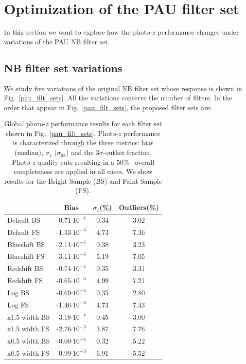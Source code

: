 \section{Optimization of the PAU filter set}
\label{sec:opti}

In this section we want to explore how the photo-$z$ performance changes under variations of the PAU NB filter set. 

\subsection{NB filter set variations}
We study five variations of the original NB filter set whose response is shown in Fig.~\ref{pau_filt_sets}. All the variations conserve the number of filters. In the order that appear in Fig.~\ref{pau_filt_sets}, the proposed filter sets are:

\begin{table}
\centering
\caption{Global photo-$z$ performance results for each filter set shown in Fig.~\ref{pau_filt_sets}.  Photo-$z$ performance is characterized through the three metrics: bias (median), $\sigma_z$ ($\sigma_{68}$) and the $3\sigma$-outlier fraction. Photo-$z$ quality cuts resulting in a 50\% \ overall completeness are applied in all cases. We show results for the
Bright Sample (BS) and Faint Sample (FS).}
\begin{tabular}{lccc}
 & Bias & $\sigma_z$(\%) & Outliers(\%) \\
\hline
Default BS & -0.71$\cdot10^{-4}$ & 0.34 & 3.02
\\
Default FS & -1.33$\cdot10^{-3}$ & 4.73 & 7.36
\\
\hline
Blueshift BS &-2.11$\cdot10^{-4}$ & 0.38 &  3.23
\\
Blueshift FS & -3.11$\cdot10^{-3}$ & 5.19 & 7.05
\\
\hline
Redshift BS &-0.74$\cdot10^{-4}$  & 0.35 &   3.31
\\
Redshift FS &  -0.65$\cdot10^{-3}$  & 4.99 & 7.21
\\
\hline
Log BS &-0.69$\cdot10^{-4}$  & 0.35 &   2.80
\\
Log FS &  -1.46$\cdot10^{-3}$  & 4.73 & 7.43
\\
\hline
x1.5 width BS &-3.18$\cdot10^{-4}$  & 0.45 &   3.00
\\
x1.5 width FS &  -2.76$\cdot10^{-3}$  & 3.87 & 7.76
\\
\hline
x0.5 width BS &-0.00$\cdot10^{-4}$  & 0.32 &   5.22
\\
x0.5 width FS &  -0.99$\cdot10^{-3}$  & 6.91 & 5.52
\\
\hline
\end{tabular}
\label{tab:pz_results_filt_sets}
\end{table}

